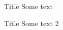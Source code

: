 \documentclass{congresso_eng_quimica}
\begin{document}
\maketitle

\begin{frame}{\center Title}
    Some text
\end{frame}

\begin{frame}{\center Title}
    Some text 2
\end{frame}


\end{document}
